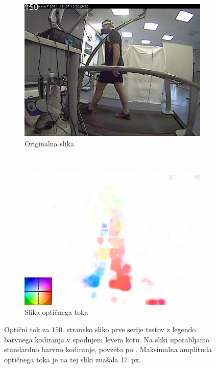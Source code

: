 \begin{figure}[!htb]
	\centering
	\begin{subfigure}{0.45\columnwidth}
		\includegraphics[width=\columnwidth]{./Slike/normal-sv-150.png}
		\caption{Originalna slika}
	\end{subfigure}
	~
	\begin{subfigure}{0.45\columnwidth}
	    \includegraphics[width=\columnwidth, frame]{./slike/normal-sv-of-coded-150.png}
		\caption{Slika optičnega toka}
	\end{subfigure}
    \caption{Optični tok za $150$. stransko sliko prve serije testov z legendo barvnega kodiranja v spodnjem levem kotu. Na sliki uporabljamo standardno barvno kodiranje, povzeto po \cite{baker2011database}. Maksimalna amplituda optičnega toka je na tej sliki znašala \SI{17}{px}.}
    \label{fig:opticni-tok-stage1}
\end{figure}

